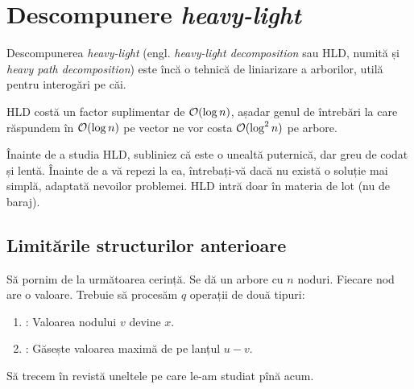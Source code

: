 \documentclass[../main.tex]{subfiles}
\begin{document}
\chapter{Descompunere \textit{heavy-light}}

Descompunerea \textit{heavy-light} (engl. \textit{heavy-light decomposition} sau HLD, numită și \textit{heavy path decomposition}) este încă o tehnică de liniarizare a arborilor, utilă pentru interogări pe căi.

HLD costă un factor suplimentar de $\mathcal{O}(\log n)$, așadar genul de întrebări la care răspundem în $\mathcal{O}(\log n)$ pe vector ne vor costa $\mathcal{O}(\log^2 n)$ pe arbore.

Înainte de a studia HLD, subliniez că este o unealtă puternică, dar greu de codat și lentă. Înainte de a vă repezi la ea, întrebați-vă dacă nu există o soluție mai simplă, adaptată nevoilor problemei. HLD intră doar în materia de lot (nu de baraj).

\section{Limitările structurilor anterioare}

Să pornim de la următoarea cerință. Se dă un arbore cu $n$ noduri. Fiecare nod are o valoare. Trebuie să procesăm $q$ operații de două tipuri:

\begin{enumerate}
  \item {}: Valoarea nodului $v$ devine $x$.
  \item {}: Găsește valoarea maximă de pe lanțul $u-v$.
\end{enumerate}

Să trecem în revistă uneltele pe care le-am studiat pînă acum.
\end{document}
